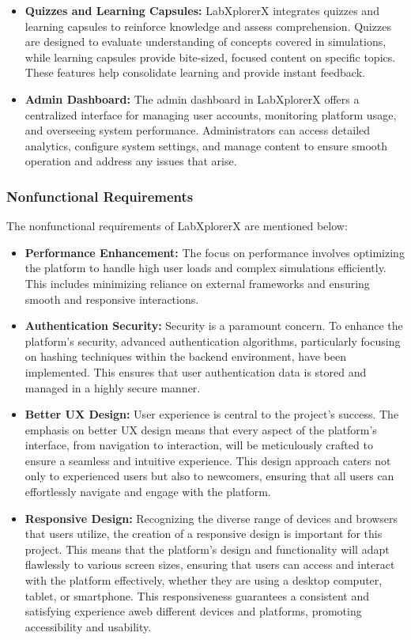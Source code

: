 \begin{itemize}
    \item \textbf{Quizzes and Learning Capsules:} LabXplorerX integrates quizzes and learning capsules to reinforce knowledge and assess comprehension. Quizzes are designed to evaluate understanding of concepts covered in simulations, while learning capsules provide bite-sized, focused content on specific topics. These features help consolidate learning and provide instant feedback.

    \item \textbf{Admin Dashboard:} The admin dashboard in LabXplorerX offers a centralized interface for managing user accounts, monitoring platform usage, and overseeing system performance. Administrators can access detailed analytics, configure system settings, and manage content to ensure smooth operation and address any issues that arise.
\end{itemize}

\subsubsection{Nonfunctional Requirements}
The nonfunctional requirements of LabXplorerX are mentioned below:
\begin{itemize}
    \item \textbf{Performance Enhancement:} The focus on performance involves optimizing the platform to handle high user loads and complex simulations efficiently. This includes minimizing reliance on external frameworks and ensuring smooth and responsive interactions.
    \item \textbf{Authentication Security:} Security is a paramount concern. To enhance the platform’s security, advanced authentication algorithms, particularly focusing on hashing techniques within the backend environment, have been implemented. This ensures that user authentication data is stored and managed in a highly secure manner.
    \item \textbf{Better UX Design:} User experience is central to the project’s success. The emphasis on better UX design means that every aspect of the platform’s interface, from navigation to interaction, will be meticulously crafted to ensure a seamless and intuitive experience. This design approach caters not only to experienced users but also to newcomers, ensuring that all users can effortlessly navigate and engage with the platform.
    \item \textbf{Responsive Design:} Recognizing the diverse range of devices and browsers that users utilize, the creation of a responsive design is important for this project. This means that the platform’s design and functionality will adapt flawlessly to various screen sizes, ensuring that users can access and interact with the platform effectively, whether they are using a desktop computer, tablet, or smartphone. This responsiveness guarantees a consistent and satisfying experience aweb different devices and platforms, promoting accessibility and usability.
\end{itemize}
